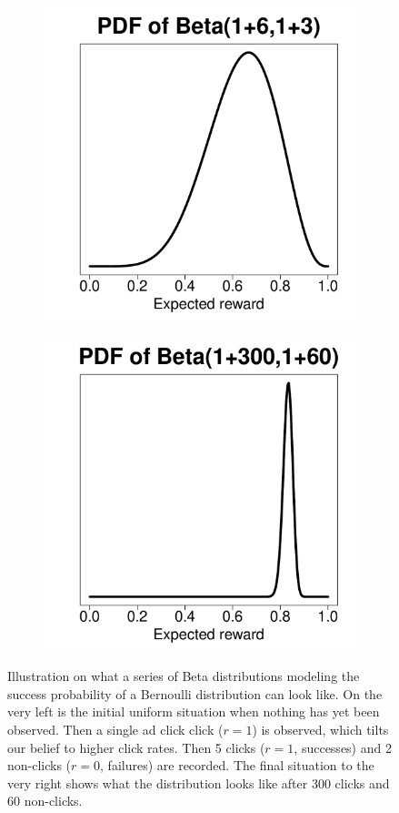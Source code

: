 \documentclass{article} %
\begin{document}
\begin{figure}[H]
\begin{subfigure}{.25\textwidth}
  \end{subfigure}%
  \begin{subfigure}{.25\textwidth}
    \centering
    \includegraphics[width=.9\linewidth]{beta3.pdf}
  \end{subfigure}%
  \begin{subfigure}{.25\textwidth}
    \centering
    \includegraphics[width=.9\linewidth]{beta4.pdf}
  \end{subfigure}
  \caption{Illustration on what a series of Beta distributions modeling the
  success probability of a Bernoulli distribution can look like. On the very
left is the initial uniform situation when nothing has yet been observed. Then
a single ad click click ($r=1$) is observed, which tilts our belief to higher click
rates. Then 5 clicks ($r=1$, successes) and 2 non-clicks ($r=0$, failures) are
recorded. The final situation to the very right shows what the distribution
looks like after 300 clicks and 60 non-clicks.}
  \label{fig:beta}
\end{figure}
\end{document}
